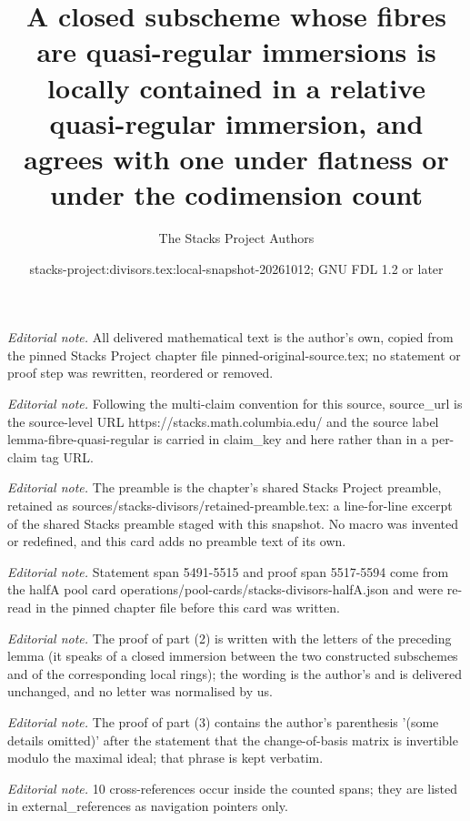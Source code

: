 \documentclass[10pt,a4paper]{amsart}
\title{A closed subscheme whose fibres are quasi-regular immersions is locally contained in a relative quasi-regular immersion, and agrees with one under flatness or under the codimension count}
\author{The Stacks Project Authors}
\date{stacks-project:divisors.tex:local-snapshot-20261012; GNU FDL 1.2 or later}
\theoremstyle{plain}
\theoremstyle{definition}
\theoremstyle{remark}
\numberwithin{equation}{subsection}
\begin{document}
\maketitle
\noindent\textit{Editorial note.} All delivered mathematical text is the author's own, copied from the pinned Stacks Project chapter file pinned-original-source.tex; no statement or proof step was rewritten, reordered or removed.\par\medskip
\noindent\textit{Editorial note.} Following the multi-claim convention for this source, source\_url is the source-level URL https://stacks.math.columbia.edu/ and the source label lemma-fibre-quasi-regular is carried in claim\_key and here rather than in a per-claim tag URL.\par\medskip
\noindent\textit{Editorial note.} The preamble is the chapter's shared Stacks Project preamble, retained as sources/stacks-divisors/retained-preamble.tex: a line-for-line excerpt of the shared Stacks preamble staged with this snapshot. No macro was invented or redefined, and this card adds no preamble text of its own.\par\medskip
\noindent\textit{Editorial note.} Statement span 5491-5515 and proof span 5517-5594 come from the halfA pool card operations/pool-cards/stacks-divisors-halfA.json and were re-read in the pinned chapter file before this card was written.\par\medskip
\noindent\textit{Editorial note.} The proof of part (2) is written with the letters of the preceding lemma (it speaks of a closed immersion between the two constructed subschemes and of the corresponding local rings); the wording is the author's and is delivered unchanged, and no letter was normalised by us.\par\medskip
\noindent\textit{Editorial note.} The proof of part (3) contains the author's parenthesis '(some details omitted)' after the statement that the change-of-basis matrix is invertible modulo the maximal ideal; that phrase is kept verbatim.\par\medskip
\noindent\textit{Editorial note.} 10 cross-references occur inside the counted spans; they are listed in external\_references as navigation pointers only.\par\medskip
\end{document}
